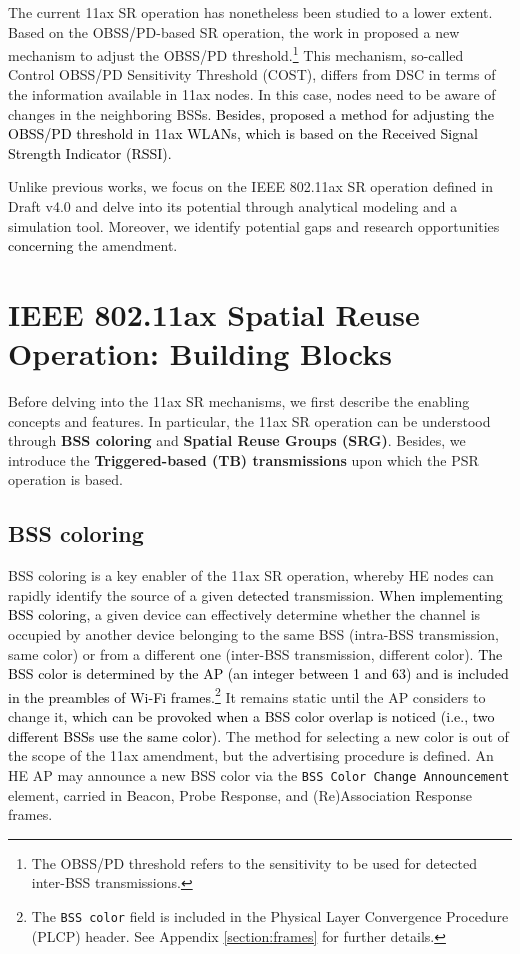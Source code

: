 \documentclass[preprint,12pt]{elsarticle}
\theoremstyle{plain}
\begin{document}
The current 11ax SR operation has nonetheless been studied to a lower extent. Based on the OBSS/PD-based SR operation, the work in \cite{selinis2018control} proposed a new mechanism to adjust the OBSS/PD threshold.\footnote{The OBSS/PD threshold refers to the sensitivity to be used for detected inter-BSS transmissions.} This mechanism, so-called Control OBSS/PD Sensitivity Threshold (COST), differs from DSC in terms of the information available in 11ax nodes. In this case, nodes need to be aware of changes in the neighboring BSSs. \textcolor{black}{Besides, \cite{ropitault2018evaluation} proposed a method for adjusting the OBSS/PD threshold in 11ax WLANs, which is based on the Received Signal Strength Indicator (RSSI).}

Unlike previous works, we focus on the IEEE 802.11ax SR operation defined in Draft v4.0 and delve into its potential through analytical modeling and a simulation tool. Moreover, we identify potential gaps and research opportunities \textcolor{black}{concerning} the amendment.

\section{IEEE 802.11ax Spatial Reuse Operation: Building Blocks}
\label{section:enablers_sr_11ax}
Before delving into the 11ax SR mechanisms, we first describe the enabling concepts and features. In particular, the 11ax SR operation can be understood through \textbf{BSS coloring} and \textbf{Spatial Reuse Groups (SRG)}. Besides, we introduce the \textbf{Triggered-based (TB) transmissions} upon which the PSR operation is based.

\subsection{BSS coloring}	
\label{section:bss_coloring}	
BSS coloring is a key enabler of the 11ax SR operation, whereby HE nodes can rapidly identify the source of a given \textcolor{black}{detected} transmission. \textcolor{black}{When implementing BSS coloring,} a given device can effectively determine whether the channel is occupied by another device belonging to the same BSS (intra-BSS transmission, same color) or from a different one (inter-BSS transmission, different color). \textcolor{black}{The BSS color is determined by the AP (an integer between 1 and 63) and is included in the preambles of Wi-Fi frames.}\footnote{The \texttt{BSS color} field is included in the Physical Layer Convergence Procedure (PLCP) header. See Appendix \ref{section:frames} for further details.} It remains static until the AP considers to change it\textcolor{black}{, which can be provoked when a BSS color overlap is noticed (i.e., two different BSSs use the same color).} The method for selecting a new color is out of the scope of the 11ax amendment, but the advertising procedure is defined. An HE AP may announce a new BSS color via the \texttt{BSS Color Change Announcement} element, carried in Beacon, Probe Response, and (Re)Association Response frames. 
\end{document}
